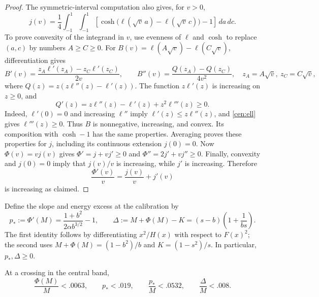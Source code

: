 \begin{proof}
The symmetric-interval computation also gives, for $v>0$,
\begin{equation}\label{cen:j-average}
 j(v)=\frac14\int_{-1}^1\int_{-1}^1
 \left[\cosh\bigl(\ell(\sqrt v\,a)-\ell(\sqrt v\,c)\bigr)-1\right]
 \,da\,dc.
\end{equation}
To prove convexity of the integrand in $v$, use evenness of $\ell$ and
$\cosh$ to replace $(a,c)$ by numbers $A\ge C\ge0$.
For $B(v)=\ell(A\sqrt v)-\ell(C\sqrt v)$, differentiation gives
\[
 B'(v)=\frac{z_A\ell'(z_A)-z_C\ell'(z_C)}{2v},\qquad
 B''(v)=\frac{Q(z_A)-Q(z_C)}{4v^2},
 \quad z_A=A\sqrt v,\ z_C=C\sqrt v,
\]
where $Q(z)=z(z\ell''(z)-\ell'(z))$.
The function $z\ell'(z)$ is increasing on $z\ge0$, and
\[
 Q'(z)=z\ell''(z)-\ell'(z)+z^2\ell'''(z)\ge0.
\]
Indeed, $\ell'(0)=0$ and increasing $\ell''$ imply
$\ell'(z)\le z\ell''(z)$, and \eqref{cen:ell} gives $\ell'''(z)\ge0$.
Thus $B$ is nonnegative, increasing, and convex.  Its composition with
$\cosh-1$ has the same properties.  Averaging proves these properties
for $j$, including its continuous extension $j(0)=0$.
Now $\Phi(v)=vj(v)$ gives
$\Phi'=j+vj'\ge0$ and $\Phi''=2j'+vj''\ge0$.
Finally, convexity and $j(0)=0$ imply that $j(v)/v$ is increasing, while
$j'$ is increasing.  Therefore
\[
 \frac{\Phi'(v)}v=\frac{j(v)}v+j'(v)
\]
is increasing as claimed.
\end{proof}

Define the slope and energy excess at the calibration by
\begin{equation}\label{cen:pdelta}
 p_*:=\Phi'(M)=\frac{1+b^2}{2\alpha b^{3/2}}-1,\qquad
 \Delta:=M+\Phi(M)-K=(s-b)\left(1+\frac1{bs}\right).
\end{equation}
The first identity follows by differentiating $x^2/H(x)$ with respect
to $F(x)^2$; the second uses
$M+\Phi(M)=(1-b^2)/b$ and $K=(1-s^2)/s$.
In particular, $p_*,\Delta\ge0$.

\begin{lemma}\label{cen:constants}
At a crossing in the central band,
\begin{equation}\label{cen:four-constants}
 \frac{\Phi(M)}M<.0063,\qquad p_*<.019,\qquad
 \frac{p_*}M<.0532,\qquad \frac\Delta M<.008.
\end{equation}
\end{lemma}

